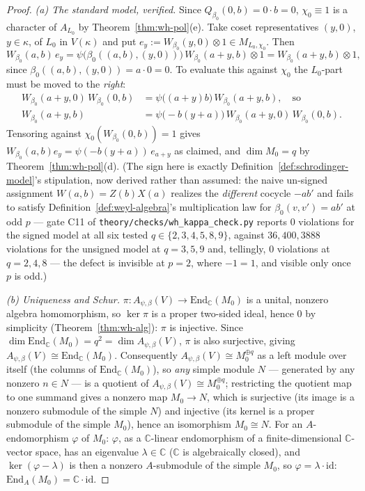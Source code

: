 \begin{proof}
\emph{(a) The standard model, verified.} Since $Q_{\beta_0}(0,b)=0\cdot b=0$,
$\chi_0\equiv 1$ is a character of $A_{L_0}$ by Theorem~\ref{thm:wh-pol}(e).
Take coset representatives $(y,0)$, $y\in\kappa$, of $L_0$ in $V(\kappa)$ and
put $e_y := W_{\beta_0}(y,0)\otimes 1 \in M_{L_0,\chi_0}$. Then
\[
W_{\beta_0}(a,b)\,e_y = \psi\big(\beta_0((a,b),(y,0))\big)\,W_{\beta_0}(a+y,b)\otimes 1
= W_{\beta_0}(a+y,b)\otimes 1,
\]
since $\beta_0((a,b),(y,0))=a\cdot 0=0$. To evaluate this against $\chi_0$
the $L_0$-part must be moved to the \emph{right}:
\begin{align*}
W_{\beta_0}(a+y,0)\,W_{\beta_0}(0,b) &= \psi\big((a+y)b\big)\,W_{\beta_0}(a+y,b), \quad\text{so} \\
W_{\beta_0}(a+y,b) &= \psi\big({-}b(y+a)\big)\,W_{\beta_0}(a+y,0)\,W_{\beta_0}(0,b).
\end{align*}
Tensoring against $\chi_0(W_{\beta_0}(0,b))=1$ gives
$W_{\beta_0}(a,b)e_y=\psi(-b(y+a))\,e_{a+y}$ as claimed, and $\dim M_0=q$ by
Theorem~\ref{thm:wh-pol}(d). (The sign here is exactly Definition~\ref{def:schrodinger-model}'s
stipulation, now derived rather than assumed: the naive un-signed assignment
$W(a,b)=Z(b)X(a)$ realizes the \emph{different} cocycle $-ab'$ and fails to
satisfy Definition~\ref{def:weyl-algebra}'s multiplication law for
$\beta_0(v,v')=ab'$ at odd $p$ — gate C11 of
\texttt{theory\slash{}checks\slash{}wh\_kappa\_check.py} reports $0$ violations for the
signed model at all six tested $q\in\{2,3,4,5,8,9\}$, against $36,400,3888$
violations for the unsigned model at $q=3,5,9$ and, tellingly, $0$ violations
at $q=2,4,8$ — the defect is invisible at $p=2$, where $-1=1$, and visible
only once $p$ is odd.)

\emph{(b) Uniqueness and Schur.} $\pi:A_{\psi,\beta}(V)\to\mathrm{End}_{\mathbb{C}}(M_0)$
is a unital, nonzero algebra homomorphism, so $\ker\pi$ is a proper two-sided
ideal, hence $0$ by simplicity (Theorem~\ref{thm:wh-alg}): $\pi$ is
injective. Since $\dim\mathrm{End}_{\mathbb{C}}(M_0)=q^2=\dim A_{\psi,\beta}(V)$,
$\pi$ is also surjective, giving $A_{\psi,\beta}(V)\cong\mathrm{End}_{\mathbb{C}}(M_0)$.
Consequently $A_{\psi,\beta}(V)\cong M_0^{\oplus q}$ as a left module over
itself (the columns of $\mathrm{End}_{\mathbb{C}}(M_0)$), so \emph{any} simple
module $N$ — generated by any nonzero $n\in N$ — is a quotient of
$A_{\psi,\beta}(V)\cong M_0^{\oplus q}$; restricting the quotient map to one
summand gives a nonzero map $M_0\to N$, which is surjective (its image is a
nonzero submodule of the simple $N$) and injective (its kernel is a proper
submodule of the simple $M_0$), hence an isomorphism $M_0\cong N$. For an
$A$-endomorphism $\varphi$ of $M_0$: $\varphi$, as a $\mathbb{C}$-linear
endomorphism of a finite-dimensional $\mathbb{C}$-vector space, has an
eigenvalue $\lambda\in\mathbb{C}$ ($\mathbb{C}$ is algebraically closed), and
$\ker(\varphi-\lambda)$ is then a nonzero $A$-submodule of the simple $M_0$,
so $\varphi=\lambda\cdot\mathrm{id}$: $\mathrm{End}_A(M_0)=\mathbb{C}\cdot\mathrm{id}$.


\end{proof}
